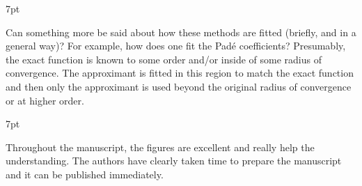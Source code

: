 \documentclass[10pt]{letter}
\newenvironment{formal}{%
  \def\FrameCommand{%
    \hspace{1pt}%
    {\color{darkblue}\vrule width 2pt}%
    {\color{formalshade}\vrule width 4pt}%
    \colorbox{formalshade}%
  }%
  \MakeFramed{\advance\hsize-\width\FrameRestore}%
  \noindent\hspace{-4.55pt}%
  \begin{adjustwidth}{}{7pt}%
  \vspace{2pt}\vspace{2pt}%
}
{%
  \vspace{2pt}\end{adjustwidth}\endMakeFramed%
}
\begin{document}
\begin{letter}
\begin{formal}
	Can something more be said about how these methods are fitted (briefly, and in a general way)? 
	For example, how does one fit the Pad\'e coefficients? 
	Presumably, the exact function is known to some order and/or inside of some radius of convergence. 
	The approximant is fitted in this region to match the exact function and then only the approximant is used beyond the original radius of convergence or at higher order.
\end{formal} 

\begin{formal}
Throughout the manuscript, the figures are excellent and really help the understanding. 
The authors have clearly taken time to prepare the manuscript and it can be published immediately.
\end{formal}


\end{letter}
\end{document}
